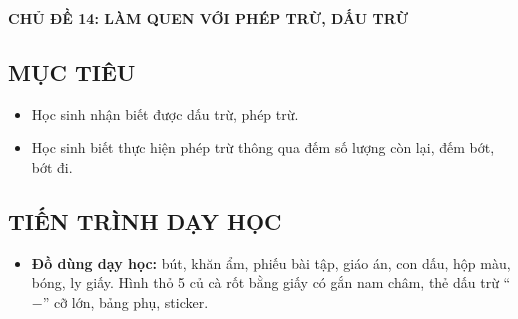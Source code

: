 \documentclass[../main.tex]{subfiles}
\begin{document}
\providecommand{\GAdongviet}{}\renewcommand{\GAdongviet}[4]{%
  \begin{scope}[shift={(#1,#2)}]
    \draw[black!80,thick] (0,1.1) -- (#3,1.1) (0,0) -- (#3,0);
    \draw[black!60,dashed] (0,0.52) -- (#3,0.52);
    \node[anchor=base west,inner sep=0pt,font=\fontsize{34}{34}\selectfont] at (0.15,0) {\GAtochu{#4}};
  \end{scope}}
\providecommand{\GAdaunang}{}\renewcommand{\GAdaunang}{\fill (0,0) circle (0.1);}
\providecommand{\GAdaunga}{}\renewcommand{\GAdaunga}{\draw[line width=2.6pt,line cap=round] (-0.3,-0.05) .. controls (-0.2,0.2) and (-0.07,0.17) .. (0,0) .. controls (0.07,-0.17) and (0.2,-0.2) .. (0.3,0.05);}

\par\medskip
\begin{center}
        {\color{mauchinh!120}\bfseries\Large CHỦ ĐỀ 14: LÀM QUEN VỚI PHÉP TRỪ, DẤU TRỪ}\\[2pt]
\end{center}
\subsection{MỤC TIÊU}
\begin{itemize}\GAgon
    \item Học sinh nhận biết được dấu trừ, phép trừ.
    \item Học sinh biết thực hiện phép trừ thông qua đếm số lượng còn lại, đếm bớt, bớt đi.
\end{itemize}

\subsection{TIẾN TRÌNH DẠY HỌC}

\begin{itemize}\GAgon
    \item \textbf{Đồ dùng dạy học:} bút, khăn ẩm, phiếu bài tập, giáo án, con dấu, hộp màu, bóng, ly giấy. Hình thỏ 5 củ cà rốt bằng giấy có gắn nam châm, thẻ dấu trừ “$-$” cỡ lớn, bảng phụ, sticker.
\end{itemize}
\end{document}
